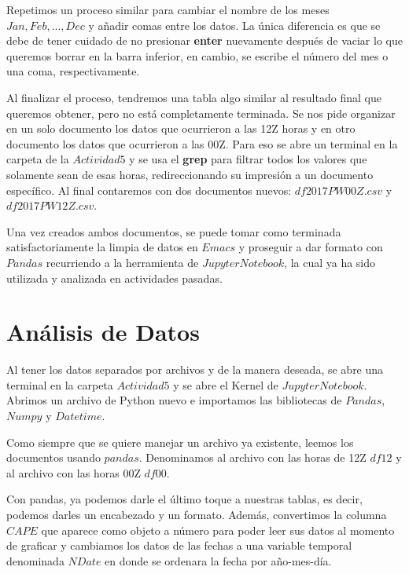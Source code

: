 \documentclass{article}
\begin{document}
Repetimos un proceso similar para cambiar el nombre de los meses $Jan, Feb,...,Dec$ y añadir comas entre los datos. La única diferencia es que se debe de tener cuidado de no presionar \textbf{enter} nuevamente después de vaciar lo que queremos borrar en la barra inferior, en cambio, se escribe el número del mes o una coma, respectivamente.

Al finalizar el proceso, tendremos una tabla algo similar al resultado final que queremos obtener, pero no está completamente terminada. Se nos pide organizar en un solo documento los datos que ocurrieron a las 12Z horas y en otro documento los datos que ocurrieron a las 00Z. Para eso se abre un terminal en la carpeta de la $Actividad 5$ y se usa el \textbf{grep} para filtrar todos los valores que solamente sean de esas horas, redireccionando su impresión a un documento específico. Al final contaremos con dos documentos nuevos: $df2017 PW 00Z.csv$ y $df2017 PW 12Z.csv$.

Una vez creados ambos documentos, se puede tomar como terminada satisfactoriamente la limpia de datos en $Emacs$ y proseguir a dar formato con $Pandas$ recurriendo a la herramienta de $Jupyter Notebook$, la cual ya ha sido utilizada y analizada en actividades pasadas.

\section{Análisis de Datos}
Al tener los datos separados por archivos y de la manera deseada, se abre una terminal en la carpeta $Actividad5$ y se abre el Kernel de $Jupyter Notebook$. Abrimos un archivo de Python nuevo e importamos las bibliotecas de $Pandas$, $Numpy$ y $Datetime$.

Como siempre que se quiere manejar un archivo ya existente, leemos los documentos usando $pandas$. Denominamos al archivo con las horas de 12Z $df12$ y al archivo con las horas 00Z $df00$. 

Con pandas, ya podemos darle el último toque a nuestras tablas, es decir, podemos darles un encabezado y un formato. Además, convertimos la columna $CAPE$ que aparece como objeto a número para poder leer sus datos al momento de graficar y cambiamos los datos de las fechas a una variable temporal denominada $NDate$ en donde se ordenara la fecha por año-mes-día.
\end{document}
